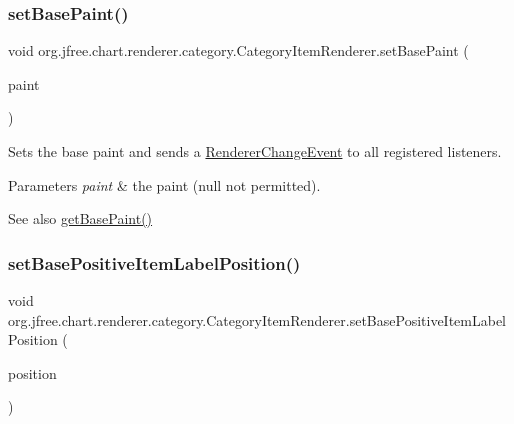 \subsubsection{\texorpdfstring{set\+Base\+Paint()}{setBasePaint()}}
{\footnotesize\ttfamily void org.\+jfree.\+chart.\+renderer.\+category.\+Category\+Item\+Renderer.\+set\+Base\+Paint (\begin{DoxyParamCaption}\item[{Paint}]{paint }\end{DoxyParamCaption})}

Sets the base paint and sends a \mbox{\hyperlink{}{Renderer\+Change\+Event}} to all registered listeners.


\begin{DoxyParams}{Parameters}
{\em paint} & the paint ({\ttfamily null} not permitted).\\
\hline
\end{DoxyParams}
\begin{DoxySeeAlso}{See also}
\mbox{\hyperlink{interfaceorg_1_1jfree_1_1chart_1_1renderer_1_1category_1_1_category_item_renderer_a4ec9128f95f8accf841ecf3d804bc04f}{get\+Base\+Paint()}} 
\end{DoxySeeAlso}
\mbox{\label{interfaceorg_1_1jfree_1_1chart_1_1renderer_1_1category_1_1_category_item_renderer_accee047a54e3074df84312e1cee05f75}} 
\subsubsection{\texorpdfstring{set\+Base\+Positive\+Item\+Label\+Position()}{setBasePositiveItemLabelPosition()}\hspace{0.1cm}{\footnotesize\ttfamily [1/2]}}
{\footnotesize\ttfamily void org.\+jfree.\+chart.\+renderer.\+category.\+Category\+Item\+Renderer.\+set\+Base\+Positive\+Item\+Label\+Position (\begin{DoxyParamCaption}\item[{\mbox{\hyperlink{classorg_1_1jfree_1_1chart_1_1labels_1_1_item_label_position}{Item\+Label\+Position}}}]{position }\end{DoxyParamCaption})}

